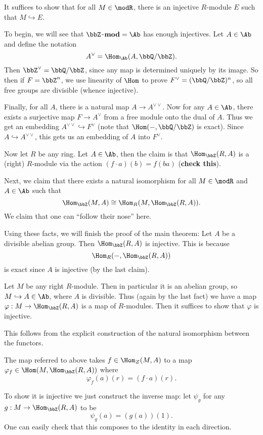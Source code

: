 \documentclass[12pt]{article}
\begin{document}
\begin{prf}
	It suffices to show that for all $M\in\modR$, there is an injective $R$-module $E$ 
	such that $M\hookrightarrow E$.

	To begin, we will see that $\bbZ$-$\mathbf{mod}=\Ab$ has enough injectives. Let $A\in\Ab$
	and define the notation
	\[A^{\vee}=\Hom_{\Ab}(A,\bbQ/\bbZ).\]
	Then $\bbZ^\vee=\bbQ/\bbZ$, since any map is determined uniquely by its image. So then if $F=\bbZ^n$,
	we use linearity of $\Hom$ to prove $F^\vee=(\bbQ/\bbZ)^n$, so all free groups are divisible (whence injective).

	Finally, for all $A$, there is a natural map $A\to A^{\vee\vee}$. Now for any $A\in\Ab$, there exists a 
	surjective map $F\to A^{\vee}$ from a free module onto the dual of $A$. Thus we get an embedding
	$A^{\vee\vee}\hookrightarrow F^\vee$ (note that $\Hom(-,\bbQ/\bbZ)$ is exact). Since $A\hookrightarrow A^{\vee\vee}$,
	this gets us an embedding of $A$ into $F^\vee$.

	\brk

	Now let $R$ be any ring. Let $A\in\Ab$, then the claim is that $\Hom_\bbZ(R,A)$ is a (right) $R$-module via
	the action $(f\cdot a)(b)=f(ba)$ (\textbf{check this}).

	Next, we claim that there exists a natural isomorphism for all $M\in\modR$ and $A\in\Ab$
	such that
	\[\Hom_\bbZ(M,A)\cong\Hom_R(M,\Hom_\bbZ(R,A)).\]
	We claim that one can ``follow their nose'' here.

	Using these facts, we will finish the proof of the main theorem: Let $A$ be a divisible abelian group.
	Then $\Hom_\bbZ(R,A)$ is injective. This is because 
	\[\Hom_R(-,\Hom_\bbZ(R,A))\]
	is exact since $A$ is injective (by the last claim).

	Let $M$ be any right $R$-module. Then in particular it is an abelian group, so 
	$M\hookrightarrow A\in\Ab$, where $A$ is divisible. Thus (again by the last fact) we have a map
	$\varphi:M\to \Hom_\bbZ(R,A)$ is a map of $R$-modules. Then it suffices to show that $\varphi$ is injective.

	This follows from the explicit construction of the natural isomorphism between the functors.
\end{prf}
\begin{rmk}
	The map referred to above takes $f\in \Hom_Z(M,A)$ to a map $\varphi_f\in\Hom(M,\Hom_\bbZ(R,A))$
	where
	\[\varphi_f(a)(r)=(f\cdot a)(r).\]

	To show it is injective we just construct the inverse map: let $\psi_g$ for any $g:M\to\Hom_\bbZ(R,A)$
	to be
	\[\psi_g(a)=(g(a))(1).\]
	One can easily check that this composes to the identity in each direction.
\end{rmk}
\end{document}
